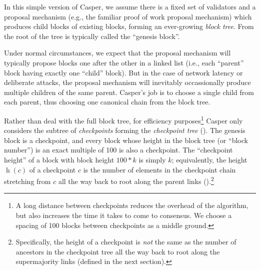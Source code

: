\documentclass[12pt]{article}
\newcommand{\h}{\operatorname{h}\xspace}
\begin{document}
In this simple version of Casper, we assume there is a fixed set of validators and a proposal mechanism (e.g., the familiar proof of work proposal mechanism) which produces child blocks of existing blocks, forming an ever-growing \emph{block tree}.  From \cite{nakamoto} the root of the tree is typically called the ``genesis block''.



Under normal circumstances, we expect that the proposal mechanism will typically propose blocks one after the other in a linked list (i.e., each ``parent'' block having exactly one ``child'' block).  But in the case of network latency or deliberate attacks, the proposal mechanism will inevitably occassionally produce multiple children of the same parent. Casper's job is to choose a single child from each parent, thus choosing one canonical chain from the block tree.


Rather than deal with the full block tree, for efficiency purposes\footnote{A long distance between checkpoints reduces the overhead of the algorithm, but also increases the time it takes to come to consensus.  We choose a spacing of 100 blocks between checkpoints as a middle ground.} Casper only considers the subtree of \emph{checkpoints} forming the \emph{checkpoint tree} ().  The genesis block is a checkpoint, and every block whose height in the block tree (or “block number”) is an exact multiple of 100 is also a checkpoint. The ``checkpoint height'' of a block with block height $100 * k$ is simply $k$; equivalently, the height $\h(c)$ of a checkpoint $c$ is the number of elements in the checkpoint chain stretching from $c$ all the way back to root along the parent links ().\footnote{Specifically, the height of a checkpoint is \emph{not} the same as the number of ancestors in the checkpoint tree all the way back to root along the supermajority links (defined in the next section).}
   
\end{document}
